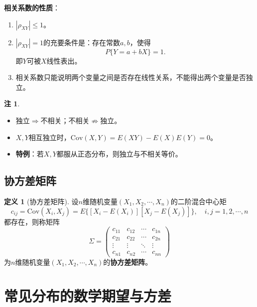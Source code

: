 \documentclass[11pt,a4paper]{report}
\theoremstyle{definition}
\newtheorem{definition}{定义}[chapter]
\newtheorem{remark}{注}[chapter]
\theoremstyle{plain}
\begin{document}
\textbf{相关系数的性质}：
\begin{enumerate}[label=\arabic*.,leftmargin=2em]
    \item $|\rho_{XY}|\leq 1$。
    \item $|\rho_{XY}|=1$的充要条件是：存在常数$a,b$，使得
    \[
    P\{Y=a+bX\}=1.
    \]
    即$Y$可被$X$线性表出。
    \item 相关系数只能说明两个变量之间是否存在线性关系，不能得出两个变量是否独立。
\end{enumerate}

\begin{remark}
\begin{itemize}[leftmargin=2em]
    \item 独立$\Rightarrow$不相关；不相关$\nRightarrow$独立。
    \item $X,Y$相互独立时，$\mathrm{Cov}(X,Y)=E(XY)-E(X)E(Y)=0$。
    \item \textbf{特例}：若$X,Y$都服从正态分布，则独立与不相关等价。
\end{itemize}
\end{remark}

\subsection{协方差矩阵}

\begin{definition}[协方差矩阵]
设$n$维随机变量$(X_1,X_2,\cdots,X_n)$的二阶混合中心矩
\[
c_{ij}=\mathrm{Cov}(X_i,X_j)=E\big\{[X_i-E(X_i)][X_j-E(X_j)]\big\},\quad i,j=1,2,\cdots,n
\]
都存在，则称矩阵
\[
\Sigma=\begin{pmatrix}
c_{11} & c_{12} & \cdots & c_{1n}\\
c_{21} & c_{22} & \cdots & c_{2n}\\
\vdots & \vdots & \ddots & \vdots\\
c_{n1} & c_{n2} & \cdots & c_{nn}
\end{pmatrix}
\]
为$n$维随机变量$(X_1,X_2,\cdots,X_n)$的\textbf{协方差矩阵}。
\end{definition}

\section{常见分布的数学期望与方差}
\end{document}
